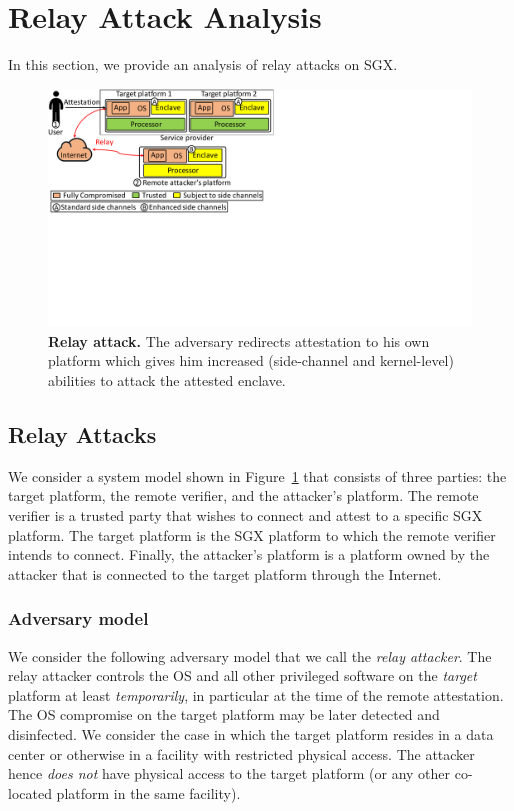 
\section{Relay Attack Analysis}
\label{sec:problemStatement}

In this section, we provide an analysis of relay attacks on SGX. 

\begin{figure}[t]
 \centering
  \includegraphics[trim={0cm 9cm 15.8cm 0},clip,width=0.75\linewidth]{chapters/ProximiTEE/figures/relayAttack2.pdf}
 \caption[Relay attack]{\textbf{Relay attack.} The adversary redirects attestation to his own platform which gives him increased (side-channel and kernel-level) abilities to attack the attested enclave.}

 \label{fig:SystemModel}
\end{figure}


\subsection{Relay Attacks}
\label{sec:problemStatement:systemAttackerModel}

We consider a system model shown in Figure~\ref{fig:SystemModel} that consists of three parties: the target platform, the remote verifier, and the attacker's platform. The remote verifier is a trusted party that wishes to connect and attest to a specific SGX platform. The target platform is the SGX platform to which the remote verifier intends to connect. Finally, the attacker's platform is a platform owned by the attacker that is connected to the target platform through the Internet.



\subsubsection{Adversary model} We consider the following adversary model that we call the \emph{relay attacker}. The relay attacker controls the OS and all other privileged software on the \emph{target} platform at least \emph{temporarily}, in particular at the time of the remote attestation. The OS compromise on the target platform may be later detected and disinfected. We consider the case in which the target platform resides in a data center or otherwise in a facility with restricted physical access. The attacker hence \emph{does not} have physical access to the target platform (or any other co-located platform in the same facility). %

